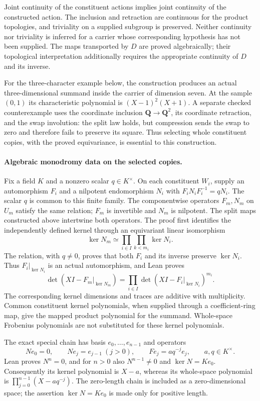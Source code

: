 \documentclass[11pt]{article}
\theoremstyle{definition}
\theoremstyle{remark}
\begin{document}
Joint continuity of the constituent actions implies joint continuity of the
constructed action. The inclusion and retraction are continuous for the
product topologies, and triviality on a supplied subgroup is preserved.
Neither continuity nor triviality is inferred for a carrier whose corresponding
hypothesis has not been supplied. The maps transported by $D$ are proved
algebraically; their topological interpretation additionally requires the
appropriate continuity of $D$ and its inverse.

For the three-character example below, the construction produces an actual
three-dimensional summand inside the carrier of dimension seven. At the sample
$(0,1)$ its characteristic polynomial is $(X-1)^2(X+1)$. A separate checked
counterexample uses the coordinate inclusion $\mathbf Q\to\mathbf Q^2$, its
coordinate retraction, and the swap involution: the split law holds, but
compression sends the swap to zero and therefore fails to preserve its square.
Thus selecting whole constituent copies, with the proved equivariance, is
essential to this construction.

\paragraph{Algebraic monodromy data on the selected copies.}
Fix a field $K$ and a nonzero scalar $q\in K^\times$. On each constituent
$W_i$, supply an automorphism $F_i$ and a nilpotent endomorphism $N_i$ with
$F_iN_iF_i^{-1}=qN_i$. The scalar $q$ is common to this finite family.
The componentwise operators $F_m,N_m$ on $U_m$ satisfy the same relation;
$F_m$ is invertible and $N_m$ is nilpotent. The split maps constructed above
intertwine both operators. The proof first identifies the independently defined
kernel through an equivariant linear isomorphism
\[
 \ker N_m\simeq\prod_{i\in I}\prod_{k<m_i}\ker N_i.
\]
The relation, with $q\ne0$, proves that both $F_i$ and its inverse preserve
$\ker N_i$. Thus $F_i|_{\ker N_i}$ is an actual automorphism, and Lean proves
\[
 \det(XI-F_m|_{\ker N_m})
   =\prod_{i\in I}\det(XI-F_i|_{\ker N_i})^{m_i}.
\]
The corresponding kernel dimensions and traces are additive with multiplicity.
Common constituent kernel polynomials, when supplied through a coefficient-ring
map, give the mapped product polynomial for the summand. Whole-space Frobenius
polynomials are not substituted for these kernel polynomials.

The exact special chain has basis $e_0,\ldots,e_{n-1}$ and operators
\[
 Ne_0=0,\qquad Ne_j=e_{j-1}\ (j>0),\qquad Fe_j=aq^{-j}e_j,
 \qquad a,q\in K^\times.
\]
Lean proves $N^n=0$, and for $n>0$ also $N^{n-1}\ne0$ and
$\ker N=Ke_0$. Consequently its kernel polynomial is $X-a$, whereas its
whole-space polynomial is $\prod_{j=0}^{n-1}(X-aq^{-j})$.
The zero-length chain is included as a zero-dimensional space; the assertion
$\ker N=Ke_0$ is made only for positive length.
\end{document}
